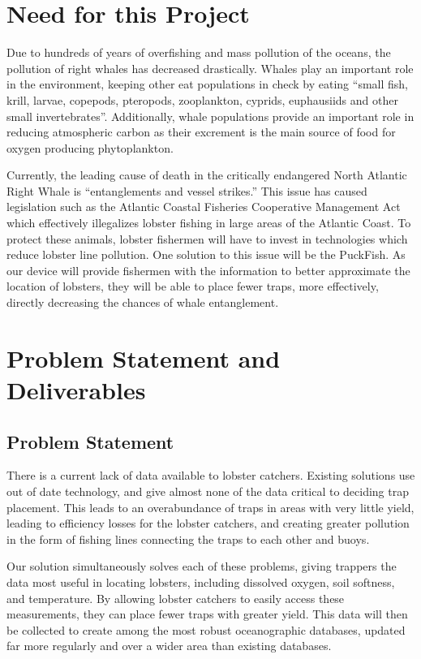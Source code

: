 \documentclass[12pt]{article}         %
\begin{document}
\twocolumn

\section{Need for this Project}

\par Due to hundreds of years of overfishing and mass pollution of the oceans, the pollution of right whales has decreased drastically. Whales play an important role in the environment, keeping other eat populations in check by eating “small fish, krill, larvae, copepods, pteropods, zooplankton, cyprids, euphausiids and other small invertebrates”. \cite{whalefacts:2015} Additionally, whale populations provide an important role in reducing atmospheric carbon as their excrement is the main source of food for oxygen producing phytoplankton. \cite{sapir:2021}

\par Currently, the leading cause of death in the critically endangered North Atlantic Right Whale is “entanglements and vessel strikes.” \cite{noaa:2021} \cite{noaa:2021_2} This issue has caused legislation such as the Atlantic Coastal Fisheries Cooperative Management Act which effectively illegalizes lobster fishing in large areas of the Atlantic Coast. \cite{congress:1981} \cite{congress:1981_2} To protect these animals, lobster fishermen will have to invest in technologies which reduce lobster line pollution. One solution to this issue will be the PuckFish. As our device will provide fishermen with the information to better approximate the location of lobsters, they will be able to place fewer traps, more effectively, directly decreasing the chances of whale entanglement. 

\section{Problem Statement and Deliverables}

\subsection{Problem Statement}

\par There is a current lack of data available to lobster catchers. Existing solutions use out of date technology, and give almost none of the data critical to deciding trap placement. This leads to an overabundance of traps in areas with very little yield, leading to efficiency losses for the lobster catchers, and creating greater pollution in the form of fishing lines connecting the traps to each other and buoys. 
\par Our solution simultaneously solves each of these problems, giving trappers the data most useful in locating lobsters, including dissolved oxygen, soil softness, and temperature. By allowing lobster catchers to easily access these measurements, they can place fewer traps with greater yield. This data will then be collected to create among the most robust oceanographic databases, updated far more regularly and over a wider area than existing databases. 
\end{document}
